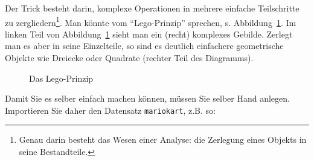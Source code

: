 \documentclass[
  a4paper,
  DIV=11]{scrreprt}
\theoremstyle{definition}
\theoremstyle{definition}
\theoremstyle{definition}
\theoremstyle{remark}
\begin{document}
Der Trick besteht darin, komplexe Operationen in mehrere einfache
Teilschritte zu zergliedern\footnote{Genau darin besteht das Wesen einer
  Analyse: die Zerlegung eines Objekts in seine Bestandteile.}. Man
könnte vom ``Lego-Prinzip'' sprechen, s. Abbildung~\ref{fig-lego}. Im
linken Teil von Abbildung~\ref{fig-lego} sieht man ein (recht) komplexes
Gebilde. Zerlegt man es aber in seine Einzelteile, so sind es deutlich
einfachere geometrische Objekte wie Dreiecke oder Quadrate (rechter Teil
des Diagramms).

\begin{figure}


\caption{\label{fig-lego}Das Lego-Prinzip}

\end{figure}%

Damit Sie es selber einfach machen können, müssen Sie selber Hand
anlegen. Importieren Sie daher den Datensatz \texttt{mariokart}, z.B.
so:
\end{document}
